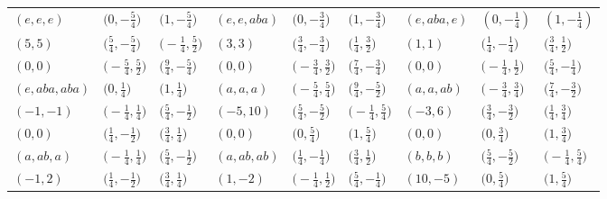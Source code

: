 \documentclass[10pt,a4paper]{amsart}
\theoremstyle{definition}
\numberwithin{equation}{section}
\begin{document}
\begin{landscape}
\begin{table}[th]\centering\small
\begin{tabular}{|lll|lll|lll|}\hline
$(e, e, e)$ & $\bigl(0, -\frac{5}{4}\bigr)$ & $\bigl(1, -\frac{5}{4}\bigr)$ & $(e, e, aba)$ & $\bigl(0, -\frac{3}{4}\bigr)$ & $\bigl(1, -\frac{3}{4}\bigr)$ & $\left(e, aba, e\right)$ & $\left(0, -\frac{1}{4}\right)$ & $\left(1, -\frac{1}{4}\right)$
\\
$(5, 5)$ & $\bigl(\frac{5}{4}, -\frac{5}{4}\bigr)$ & $\bigl(-\frac{1}{4}, \frac{5}{2}\bigr)$ & $(3, 3)$ & $\bigl(\frac{3}{4}, -\frac{3}{4}\bigr)$ & $\bigl(\frac{1}{4}, \frac{3}{2}\bigr)$ & $(1, 1)$ & $\bigl(\frac{1}{4}, -\frac{1}{4}\bigr)$ & $\bigl(\frac{3}{4}, \frac{1}{2}\bigr)$
\\
$(0, 0)$ & $\bigl(-\frac{5}{4}, \frac{5}{2}\bigr)$ & $\bigl(\frac{9}{4}, -\frac{5}{4}\bigr)$ & $(0, 0)$ & $\bigl(-\frac{3}{4}, \frac{3}{2}\bigr)$ & $\bigl(\frac{7}{4}, -\frac{3}{4}\bigr)$ & $(0, 0)$ & $\bigl(-\frac{1}{4}, \frac{1}{2}\bigr)$ & $\bigl(\frac{5}{4}, -\frac{1}{4}\bigr)$
\\\hline
$(e, aba, aba)$ & $\bigl(0, \frac{1}{4}\bigr)$ & $\bigl(1, \frac{1}{4}\bigr)$ & $(a, a, a)$ & $\bigl(-\frac{5}{4}, \frac{5}{4}\bigr)$ & $\bigl(\frac{9}{4}, -\frac{5}{2}\bigr)$ & $(a, a, ab)$ & $\bigl(-\frac{3}{4}, \frac{3}{4}\bigr)$ & $\bigl(\frac{7}{4}, -\frac{3}{2}\bigr)$
\\
$(-1, -1)$ & $\bigl(-\frac{1}{4}, \frac{1}{4}\bigr)$ & $\bigl(\frac{5}{4}, -\frac{1}{2}\bigr)$ & $(-5, 10)$ & $\bigl(\frac{5}{4}, -\frac{5}{2}\bigr)$ & $\bigl(-\frac{1}{4}, \frac{5}{4}\bigr)$ & $(-3, 6)$ & $\bigl(\frac{3}{4}, -\frac{3}{2}\bigr)$ & $\bigl(\frac{1}{4}, \frac{3}{4}\bigr)$
\\
$(0, 0)$ & $\bigl(\frac{1}{4}, -\frac{1}{2}\bigr)$ & $\bigl(\frac{3}{4}, \frac{1}{4}\bigr)$ & $(0, 0)$ & $\bigl(0, \frac{5}{4}\bigr)$ & $\bigl(1, \frac{5}{4}\bigr)$ & $(0, 0)$ & $\bigl(0, \frac{3}{4}\bigr)$ & $\bigl(1, \frac{3}{4}\bigr)$
\\\hline
$(a, ab, a)$ & $\bigl(-\frac{1}{4}, \frac{1}{4}\bigr)$ & $\bigl(\frac{5}{4}, -\frac{1}{2}\bigr)$ & $(a, ab, ab)$ & $\bigl(\frac{1}{4}, -\frac{1}{4}\bigr)$ & $\bigl(\frac{3}{4}, \frac{1}{2}\bigr)$ & $(b, b, b)$ & $\bigl(\frac{5}{4}, -\frac{5}{2}\bigr)$ & $\bigl(-\frac{1}{4}, \frac{5}{4}\bigr)$
\\
$(-1, 2)$ & $\bigl(\frac{1}{4}, -\frac{1}{2}\bigr)$ & $\bigl(\frac{3}{4}, \frac{1}{4}\bigr)$ & $(1, -2)$ & $\bigl(-\frac{1}{4}, \frac{1}{2}\bigr)$ & $\bigl(\frac{5}{4}, -\frac{1}{4}\bigr)$ & $(10, -5)$ & $\bigl(0, \frac{5}{4}\bigr)$ & $\bigl(1, \frac{5}{4}\bigr)$

\end{tabular}
\end{table}
\end{landscape}
\end{document}
